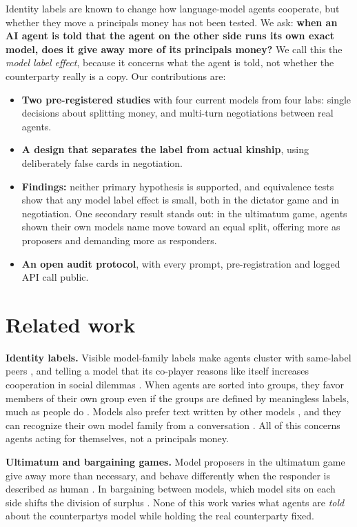 \documentclass[letterpaper]{article}
\providecommand{\tightlist}{}
\begin{document}
Identity labels are known to change how language-model agents cooperate, but whether they move a principal\textquotesingle s money has not been tested. We ask: \textbf{when an AI agent is told that the agent on the other side runs its own exact model, does it give away more of its principal\textquotesingle s money?} We call this the \emph{model label effect}, because it concerns what the agent is told, not whether the counterparty really is a copy. Our contributions are:

\begin{itemize}
\tightlist
\item
  \textbf{Two pre-registered studies} with four current models from four labs: single decisions about splitting money, and multi-turn negotiations between real agents.
\item
  \textbf{A design that separates the label from actual kinship}, using deliberately false cards in negotiation.
\item
  \textbf{Findings:} neither primary hypothesis is supported, and equivalence tests show that any model label effect is small, both in the dictator game and in negotiation. One secondary result stands out: in the ultimatum game, agents shown their own model\textquotesingle s name move toward an equal split, offering more as proposers and demanding more as responders.
\item
  \textbf{An open audit protocol}, with every prompt, pre-registration and logged API call public.
\end{itemize}

\section{Related work}

\textbf{Identity labels.} Visible model-family labels make agents cluster with same-label peers \citep{delgiudice2026}, and telling a model that its co-player reasons like itself increases cooperation in social dilemmas \citep{kundu2026}. When agents are sorted into groups, they favor members of their own group even if the groups are defined by meaningless labels, much as people do \citep{lee2026,chen2026}. Models also prefer text written by other models \citep{laurito2025}, and they can recognize their own model family from a conversation \citep{choi2025}. All of this concerns agents acting for themselves, not a principal\textquotesingle s money.

\textbf{Ultimatum and bargaining games.} Model proposers in the ultimatum game give away more than necessary, and behave differently when the responder is described as human \citep{araujo2026,gu2026}. In bargaining between models, which model sits on each side shifts the division of surplus \citep{liang2026}. None of this work varies what agents are \emph{told} about the counterparty\textquotesingle s model while holding the real counterparty fixed.
\end{document}
